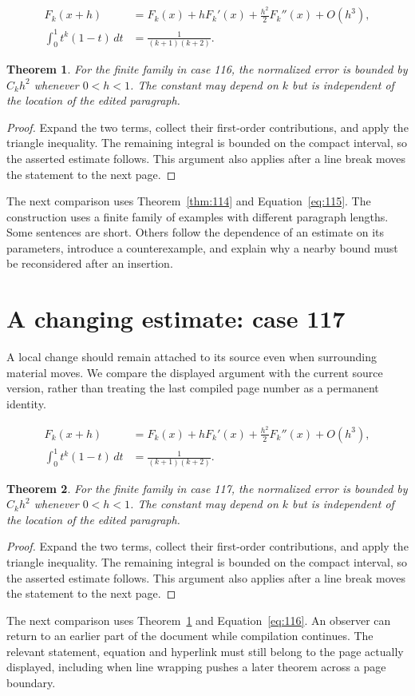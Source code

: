 \documentclass[a4paper,10pt]{article}
\newtheorem{theorem}{Theorem}[section]
\begin{document}
\lipsum[16-17]
\begin{align}\label{eq:115}
 F_k(x+h)&=F_k(x)+hF_k'(x)+\frac{h^2}{2}F_k''(x)+O(h^3),\\
 \int_0^1 t^k(1-t)\,dt&=\frac{1}{(k+1)(k+2)}.
\end{align}
\begin{theorem}\label{thm:115}
For the finite family in case 116, the normalized error is bounded by $C_k h^2$ whenever $0<h<1$. The constant may depend on $k$ but is independent of the location of the edited paragraph.
\end{theorem}
\begin{proof}
Expand the two terms, collect their first-order contributions, and apply the
triangle inequality. The remaining integral is bounded on the compact interval,
so the asserted estimate follows. This argument also applies after a line break
moves the statement to the next page.
\end{proof}
The next comparison uses Theorem~\ref{thm:114} and Equation~\ref{eq:115}. The construction uses a finite family of examples with different paragraph lengths. Some sentences are short. Others follow the dependence of an estimate on its parameters, introduce a counterexample, and explain why a nearby bound must be reconsidered after an insertion.

\lipsum[3]

\section{A changing estimate: case 117}\label{unit:116}
A local change should remain attached to its source even when surrounding material moves. We compare the displayed argument with the current source version, rather than treating the last compiled page number as a permanent identity.

\lipsum[19-20]
\begin{align}\label{eq:116}
 F_k(x+h)&=F_k(x)+hF_k'(x)+\frac{h^2}{2}F_k''(x)+O(h^3),\\
 \int_0^1 t^k(1-t)\,dt&=\frac{1}{(k+1)(k+2)}.
\end{align}
\begin{theorem}\label{thm:116}
For the finite family in case 117, the normalized error is bounded by $C_k h^2$ whenever $0<h<1$. The constant may depend on $k$ but is independent of the location of the edited paragraph.
\end{theorem}
\begin{proof}
Expand the two terms, collect their first-order contributions, and apply the
triangle inequality. The remaining integral is bounded on the compact interval,
so the asserted estimate follows. This argument also applies after a line break
moves the statement to the next page.
\end{proof}
The next comparison uses Theorem~\ref{thm:115} and Equation~\ref{eq:116}. An observer can return to an earlier part of the document while compilation continues. The relevant statement, equation and hyperlink must still belong to the page actually displayed, including when line wrapping pushes a later theorem across a page boundary.
\end{document}
